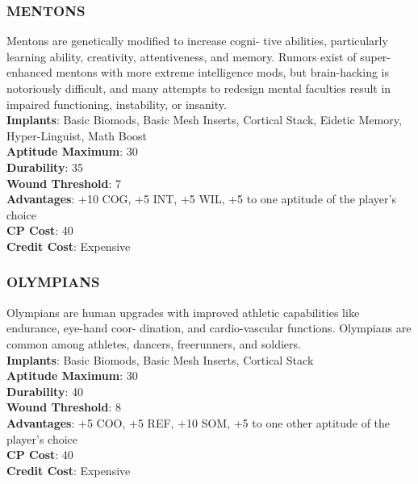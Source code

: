 \subsubsection{MENTONS}
Mentons are genetically modified to increase cogni-
tive abilities, particularly learning ability, creativity,
attentiveness, and memory. Rumors exist of super-
enhanced mentons with more extreme intelligence
mods, but brain-hacking is notoriously difficult, and
many attempts to redesign mental faculties result in
impaired functioning, instability, or insanity.
\\ \textbf{Implants}: Basic Biomods, Basic Mesh Inserts, Cortical
Stack, Eidetic Memory, Hyper-Linguist, Math Boost
\\ \textbf{Aptitude Maximum}: 30
\\ \textbf{Durability}: 35
\\ \textbf{Wound Threshold}: 7
\\ \textbf{Advantages}: +10 COG, +5 INT, +5 WIL, +5 to one
aptitude of the player’s choice
\\ \textbf{CP Cost}: 40
\\ \textbf{Credit Cost}: Expensive

\subsubsection{OLYMPIANS}
Olympians are human upgrades with improved
athletic capabilities like endurance, eye-hand coor-
dination, and cardio-vascular functions. Olympians
are common among athletes, dancers, freerunners,
and soldiers.
\\ \textbf{Implants}: Basic Biomods, Basic Mesh Inserts,
Cortical Stack
\\ \textbf{Aptitude Maximum}: 30
\\ \textbf{Durability}: 40
\\ \textbf{Wound Threshold}: 8
\\ \textbf{Advantages}: +5 COO, +5 REF, +10 SOM, +5 to one
other aptitude of the player’s choice
\\ \textbf{CP Cost}: 40
\\ \textbf{Credit Cost}: Expensive

